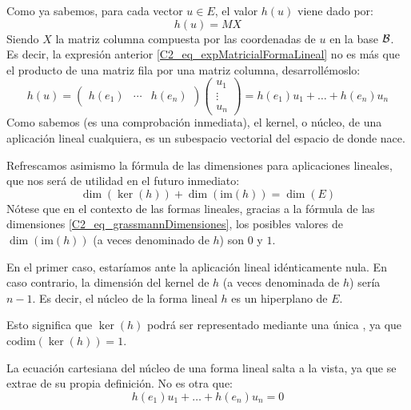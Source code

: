 Como ya sabemos, para cada vector $u\in E$, el valor $h(u)$ viene dado por:
\begin{equation}
	\label{C2_eq_expMatricialFormaLineal}
	h(u)=MX	
\end{equation}
Siendo $X$ la matriz columna compuesta por las coordenadas de $u$ en la base $\mathcal{B}$. Es decir, la expresión anterior \eqref{C2_eq_expMatricialFormaLineal} no es más que el producto de una matriz fila por una matriz columna, desarrollémoslo:
\begin{equation}
	\label{C2_eq_expMatricialFormaLinealExpandida}
	h(u)=\begin{pmatrix}
	h(e_1) & \cdots & h(e_n)
	\end{pmatrix}\begin{pmatrix}
	u_1\\
	\vdots\\
	u_n
	\end{pmatrix}=h(e_1)u_1+\dots+h(e_n)u_n
\end{equation}
Como sabemos (es una comprobación inmediata), el kernel, o núcleo, de una aplicación lineal cualquiera, es un subespacio vectorial del espacio de donde nace.

Refrescamos asimismo la fórmula de las dimensiones para aplicaciones lineales, que nos será de utilidad en el futuro inmediato:
\begin{equation}
	\label{C2_eq_grassmannDimensiones}
	\dim(\ker(h))+\dim(\mathrm{im}(h))=\dim(E)
\end{equation}
Nótese que en el contexto de las formas lineales, gracias a la fórmula de las dimensiones \eqref{C2_eq_grassmannDimensiones}, los posibles valores de $\dim(\mathrm{im}(h))$ (a veces denominado  de $h$) son $0$ y $1$. 

En el primer caso, estaríamos ante la aplicación lineal idénticamente nula. En caso contrario, la dimensión del kernel de $h$ (a veces denominada  de $h$) sería $n-1$. Es decir, el núcleo de la forma lineal $h$ es un hiperplano de $E$.

Esto significa que $\ker(h)$ podrá ser representado mediante una única , ya que $\mathrm{codim}(\ker(h))=1$.

La ecuación cartesiana del núcleo de una forma lineal salta a la vista, ya que se extrae de su propia definición. No es otra que:
\begin{equation}
	\label{C2_eq_ecuacionCartesianaKer}
	h(e_1)u_1+\dots+h(e_n)u_n=0
\end{equation}

